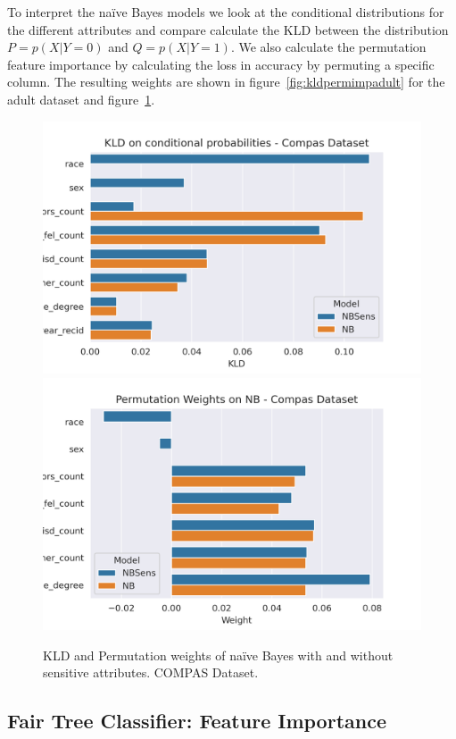 To interpret the naïve Bayes models we look at the conditional distributions for the different attributes and compare calculate the KLD between the distribution $P = p(X|Y=0)$ and $Q = p(X|Y=1)$. We also calculate the permutation feature importance by calculating the loss in accuracy by permuting a specific column. The resulting weights are shown in figure~\ref{fig:kldpermimpadult} for the adult dataset and figure~\ref{fig:kldpermimpcompas}.

\begin{figure}
    \centering
    \includegraphics[width=0.49\linewidth]{figures/KLDimportance-compas.png}
    \includegraphics[width=0.49\linewidth]{figures/permimportance-compas.png}
    \caption{KLD and Permutation weights of naïve Bayes with and without sensitive attributes. COMPAS Dataset.}
    \label{fig:kldpermimpcompas}
\end{figure}

\subsection{Fair Tree Classifier: Feature Importance}

